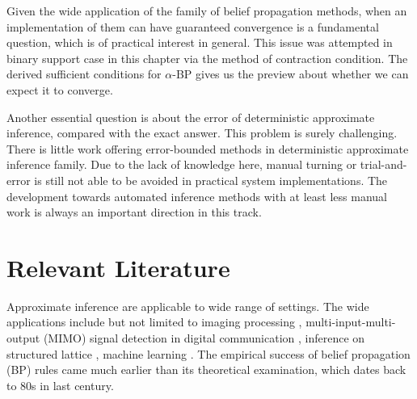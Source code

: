 Given the wide application of the family of belief propagation methods, when an implementation of them can have guaranteed convergence is a fundamental question, which is of practical interest in general. This issue was attempted in binary support case in this chapter via the method of contraction condition. The derived sufficient conditions for $\alpha$-BP gives us the preview about whether we can expect it to converge.

Another essential question is about the error of deterministic approximate inference, compared with the exact answer. This problem is surely challenging. There is little work offering error-bounded methods in deterministic approximate inference family. Due to the lack of knowledge here, manual turning or trial-and-error is still not able to be avoided in practical system implementations. The development towards automated inference methods with at least less manual work is always an important direction in this track. 

\section{Relevant Literature}

Approximate inference are applicable to wide range of settings. The wide applications include but not limited to imaging processing \cite{zhang2013denoise}, multi-input-multi-output (MIMO) signal detection in digital communication \cite{cespedes2014ep,jeon2015optimality}, inference on structured lattice \cite{10.2307/25651244}, machine learning  \cite{2018arXiv180607066M, Lin:2015:DLM:2969239.2969280, yoon2019inferenceGraph}. The empirical success of  belief propagation (BP) rules came much earlier than its theoretical examination, which dates back to $80$s in last century\cite{pearl1986b}.

